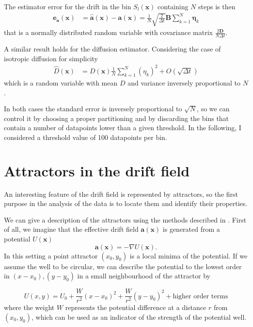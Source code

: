 \documentclass[a4paper]{article}
\begin{document}
The estimator error for the drift in the bin $S_l(\bm{x})$ containing $N$ steps is then
\begin{align}
\bm{e_a}(\bm{x}) &= \hat{\bm{a}}(\bm{x}) - \bm{a}(\bm{x}) = \frac{1}{N} \sqrt{\frac{2}{\Delta t}} \bm{B} \sum_{k = 1}^N \bm{\eta}_k
\end{align}
that is a normally distributed random variable with covariance matrix $\frac{2 \bm{D}}{N \Delta t}$.

A similar result holds for the diffusion estimator. Considering the case of isotropic diffusion for simplicity
\begin{align}
\hat{D}(\bm{x}) &= D(\bm{x}) \frac{1}{N} \sum_{k = 1}^N \left(\eta_k\right)^2 + O(\sqrt{\Delta t})
\end{align}
which is a random variable with mean $D$ and variance inversely proportional to $N$.

In both cases the standard error is inversely proportional to $\sqrt{N}$, so we can control it by choosing a proper partitioning and by discarding the bins that contain a number of datapoints lower than a given threshold. In the following, I considered a threshold value of 100 datapoints per bin.


\section{Attractors in the drift field}

An interesting feature of the drift field is represented by attractors, so the first purpose in the analysis of the data is to locate them and identify their properties.

We can give a description of the attractors using the methods described in \cite{hoze2012}. First of all, we imagine that the effective drift field $\bm{a}(\bm{x})$ is generated from a potential $U(\bm{x})$
\begin{equation} \label{eq:conservative}
\bm{a}(\bm{x}) = -\nabla U(\bm{x}).
\end{equation}
In this setting a point attractor $(x_0, y_0)$ is a local minima of the potential. If we assume the well to be circular, we can describe the potential to the lowest order in $(x - x_0), (y - y_0)$ in a small neighbourhood of the attractor by

\begin{equation} \label{eq:well}
U(x, y) = U_0 + \frac{W}{r^2}\left(x - x_0\right)^2 + \frac{W}{r^2}\left(y - y_0\right)^2 + \text{higher order terms}
\end{equation}
where the weight $W$ represents the potential difference at a distance $r$ from $(x_0, y_0)$, which can be used as an indicator of the strength of the potential well.
\end{document}
